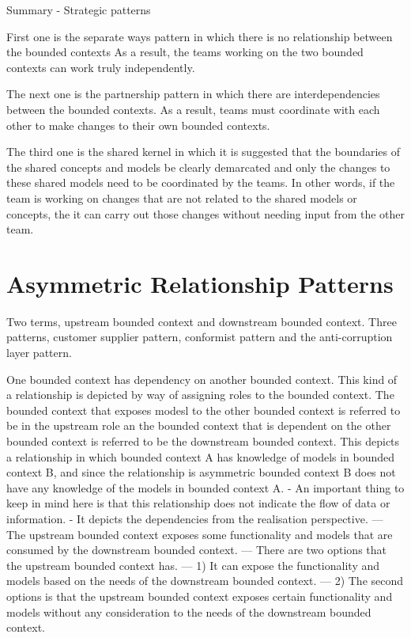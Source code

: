 \documentclass[a4paper, 11pt]{book}
\begin{document}
    Summary - Strategic patterns

    First one is the separate ways pattern in which there is no relationship between the bounded contexts
    As a result, the teams working on the two bounded contexts can work truly independently.

    The next one is the partnership pattern in which there are interdependencies between the bounded contexts.
    As a result, teams must coordinate with each other to make changes to their own bounded contexts.

    The third one is the shared kernel in which it is suggested that the boundaries of the shared concepts and models be clearly demarcated and only the changes to these shared models need to be coordinated by the teams.
    In other words, if the team is working on changes that are not related to the shared models or concepts, the it can carry out those changes without needing input from the other team.


    \section{Asymmetric Relationship Patterns}

    Two terms, upstream bounded context and downstream bounded context.
    Three patterns, customer supplier pattern, conformist pattern and the anti-corruption layer pattern.

    One bounded context has dependency on another bounded context.
    This kind of a relationship is depicted by way of assigning roles to the bounded context.
    The bounded context that exposes modesl to the other bounded context is referred to be in the upstream role an the bounded context that is dependent on the other bounded context is referred to be the downstream bounded context.
    This depicts a relationship in which bounded context A has knowledge of models in bounded context B, and since the relationship is asymmetric bounded context B does not have any knowledge of the models in bounded context A.
    - An important thing to keep in mind here is that this relationship does not indicate the flow of data or information.
    - It depicts the dependencies from the realisation perspective.
    --- The upstream bounded context exposes some functionality and models that are consumed by the downstream bounded context.
    --- There are two options that the upstream bounded context has.
    --- 1) It can expose the functionality and models based on the needs of the downstream bounded context.
    --- 2) The second options is that the upstream bounded context exposes certain functionality and models without any consideration to the needs of the downstream bounded context.
\end{document}
